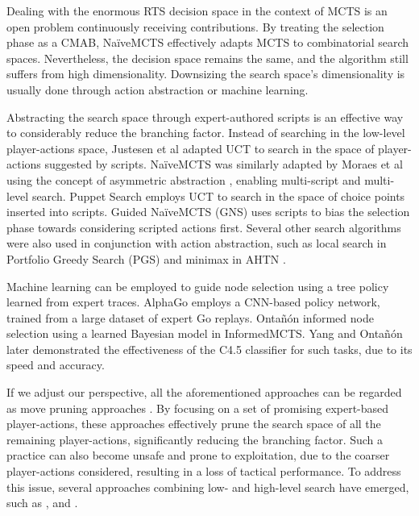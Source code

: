 \documentclass[conference]{IEEEtran}
\begin{document}
Dealing with the enormous RTS decision space in the context of MCTS is an open problem continuously receiving contributions. By treating the selection phase as a CMAB, NaïveMCTS effectively adapts MCTS to combinatorial search spaces. Nevertheless, the decision space remains the same, and the algorithm still suffers from high dimensionality. Downsizing the search space's dimensionality is usually done through action abstraction or machine learning.

Abstracting the search space through expert-authored scripts is an effective way to considerably reduce the branching factor. Instead of searching in the low-level player-actions space, Justesen et al \cite{justesen_script-_2014} adapted UCT to search in the space of player-actions suggested by scripts. NaïveMCTS was similarly adapted by Moraes et al \cite{moraes_action_2018} using the concept of asymmetric abstraction \cite{moraes_asymmetric_2018}, enabling multi-script and multi-level search. Puppet Search \cite{barriga_puppet_2015} employs UCT to search in the space of choice points inserted into scripts. Guided NaïveMCTS (GNS) \cite{yang_guiding_2019} uses scripts to bias the selection phase towards considering scripted actions first. Several other search algorithms were also used in conjunction with action abstraction, such as local search in Portfolio Greedy Search (PGS) \cite{churchill_portfolio_2013} and minimax in AHTN \cite{ontanon_adversarial_2015}.

Machine learning can be employed to guide node selection using a tree policy learned from expert traces. AlphaGo \cite{silver_mastering_2016} employs a CNN-based policy network, trained from a large dataset of expert Go replays. Ontañón informed node selection using a learned Bayesian model in InformedMCTS. Yang and Ontañón \cite{yang_extracting_2019} later demonstrated the effectiveness of the C4.5 classifier for such tasks, due to its speed and accuracy.


If we adjust our perspective, all the aforementioned approaches can be regarded as move pruning approaches \cite{yang_integrating_2020}. By focusing on a set of promising expert-based player-actions, these approaches effectively prune the search space of all the remaining player-actions, significantly reducing the branching factor. Such a practice can also become unsafe and prone to exploitation, due to the coarser player-actions considered, resulting in a loss of tactical performance. To address this issue, several approaches combining low- and high-level search have emerged, such as \cite{barriga_combining_2017}, \cite{neufeld_hybrid_2019} and \cite{moraes_action_2018}.
\end{document}
